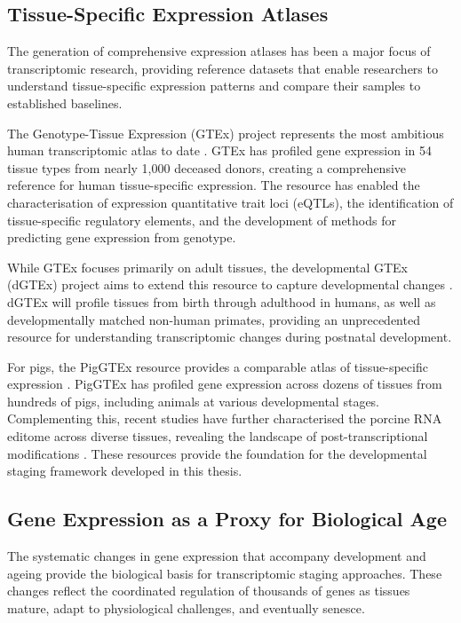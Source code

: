 \subsection{Tissue-Specific Expression Atlases}

The generation of comprehensive expression atlases has been a major focus of transcriptomic research, providing reference datasets that enable researchers to understand tissue-specific expression patterns and compare their samples to established baselines.

The Genotype-Tissue Expression (GTEx) project represents the most ambitious human transcriptomic atlas to date \parencite{the_gtex_consortium_gtex_2020}. GTEx has profiled gene expression in 54 tissue types from nearly 1,000 deceased donors, creating a comprehensive reference for human tissue-specific expression. The resource has enabled the characterisation of expression quantitative trait loci (eQTLs), the identification of tissue-specific regulatory elements, and the development of methods for predicting gene expression from genotype.

While GTEx focuses primarily on adult tissues, the developmental GTEx (dGTEx) project aims to extend this resource to capture developmental changes \parencite{coorens_human_2025}. dGTEx will profile tissues from birth through adulthood in humans, as well as developmentally matched non-human primates, providing an unprecedented resource for understanding transcriptomic changes during postnatal development.

For pigs, the PigGTEx resource provides a comparable atlas of tissue-specific expression \parencite{teng_compendium_2024, chen_construction_2025}. PigGTEx has profiled gene expression across dozens of tissues from hundreds of pigs, including animals at various developmental stages. Complementing this, recent studies have further characterised the porcine RNA editome across diverse tissues, revealing the landscape of post-transcriptional modifications \parencite{long_comprehensive_2024}. These resources provide the foundation for the developmental staging framework developed in this thesis.

\subsection{Gene Expression as a Proxy for Biological Age}

The systematic changes in gene expression that accompany development and ageing provide the biological basis for transcriptomic staging approaches. These changes reflect the coordinated regulation of thousands of genes as tissues mature, adapt to physiological challenges, and eventually senesce.

